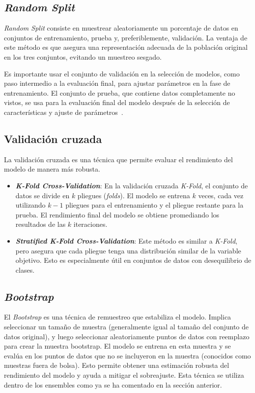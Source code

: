 \subsection{\textit{Random Split}}
\textit{Random Split} consiste en muestrear aleatoriamente un porcentaje de datos en conjuntos de entrenamiento, prueba y, preferiblemente, validación. La ventaja de este método es que asegura una representación adecuada de la población original en los tres conjuntos, evitando un muestreo sesgado.

Es importante usar el conjunto de validación en la selección de modelos, como paso intermedio a la evaluación final, para ajustar parámetros en la fase de entrenamiento. El conjunto de prueba, que contiene datos completamente no vistos, se usa para la evaluación final del modelo después de la selección de características y ajuste de parámetros~\cite{web:evaluate}.

\subsection{Validación cruzada}
La validación cruzada es una técnica que permite evaluar el rendimiento del modelo de manera más robusta.
\begin{itemize}
	\item \textbf{\textit{K-Fold Cross-Validation}}: En la validación cruzada \textit{K-Fold}, el conjunto de datos se divide en $k$ pliegues (\textit{folds}). El modelo se entrena $k$ veces, cada vez utilizando $k-1$ pliegues para el entrenamiento y el pliegue restante para la prueba. El rendimiento final del modelo se obtiene promediando los resultados de las $k$ iteraciones.
	\item \textbf{\textit{Stratified K-Fold Cross-Validation}}: Este método es similar a \textit{K-Fold}, pero asegura que cada pliegue tenga una distribución similar de la variable objetivo. Esto es especialmente útil en conjuntos de datos con desequilibrio de clases.
\end{itemize}

\subsection{\textit{Bootstrap}}
El \textit{Bootstrap} es una técnica de remuestreo que estabiliza el modelo. Implica seleccionar un tamaño de muestra (generalmente igual al tamaño del conjunto de datos original), y luego seleccionar aleatoriamente puntos de datos con reemplazo para crear la muestra bootstrap. El modelo se entrena en esta muestra y se evalúa en los puntos de datos que no se incluyeron en la muestra (conocidos como muestras fuera de bolsa). Esto permite obtener una estimación robusta del rendimiento del modelo y ayuda a mitigar el sobreajuste. Esta técnica se utiliza dentro de los ensembles como ya se ha comentado en la sección anterior.


